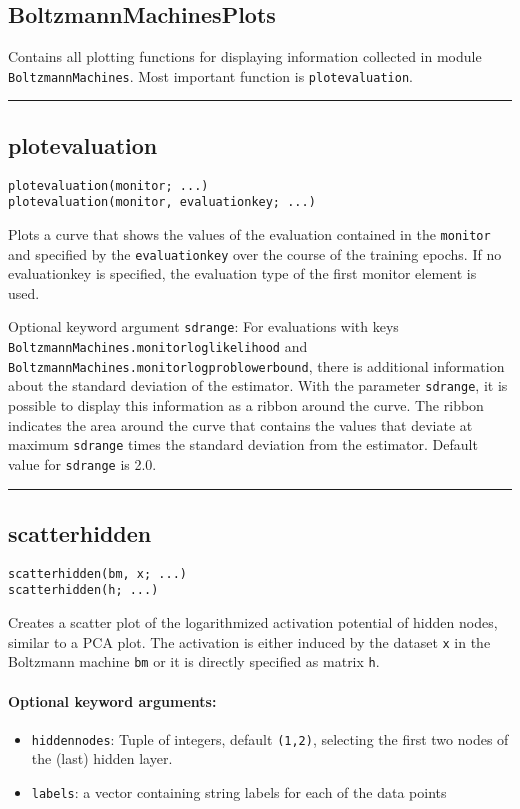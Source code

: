 \subsection*{BoltzmannMachinesPlots}  \label{bmplots_BoltzmannMachinesPlots}
Contains all plotting functions for displaying information collected in module \texttt{BoltzmannMachines}. Most important function is \texttt{plotevaluation}.

\noindent\rule{\textwidth}{1pt}
\subsection*{plotevaluation}  \label{bmplots_plotevaluation}
\begin{verbatim}
plotevaluation(monitor; ...)
plotevaluation(monitor, evaluationkey; ...)
\end{verbatim}
Plots a curve that shows the values of the evaluation contained in the \texttt{monitor} and specified by the \texttt{evaluationkey} over the course of the training epochs. If no evaluationkey is specified, the evaluation type of the first monitor element is used.

Optional keyword argument \texttt{sdrange}: For evaluations with keys \texttt{BoltzmannMachines.\allowbreak monitorloglikelihood} and \texttt{BoltzmannMachines.\allowbreak monitorlogproblowerbound}, there is additional information about the standard deviation of the estimator. With the parameter \texttt{sdrange}, it is possible to display this information as a ribbon around the curve. The ribbon indicates the area around the curve that contains the values that deviate at maximum \texttt{sdrange} times the standard deviation from the estimator. Default value for \texttt{sdrange} is 2.0.

\noindent\rule{\textwidth}{1pt}
\subsection*{scatterhidden}  \label{bmplots_scatterhidden}
\begin{verbatim}
scatterhidden(bm, x; ...)
scatterhidden(h; ...)
\end{verbatim}
Creates a scatter plot of the logarithmized activation potential of hidden nodes, similar to a PCA plot. The activation is either induced by the dataset \texttt{x} in the Boltzmann machine \texttt{bm} or it is directly specified as matrix \texttt{h}.

\paragraph*{Optional keyword arguments:}
\begin{itemize}
\item \texttt{hiddennodes}: Tuple of integers, default \texttt{(1,2)}, selecting the first two nodes of the (last) hidden layer.


\item \texttt{labels}: a vector containing string labels for each of the data points

\end{itemize}
